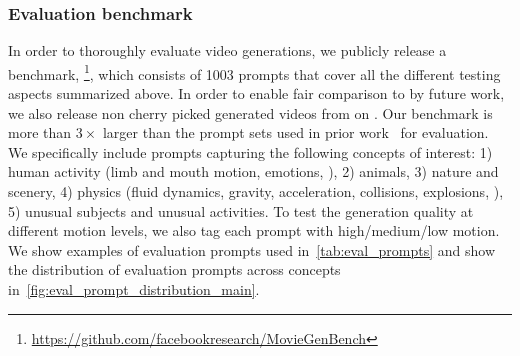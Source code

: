 \subsubsection{Evaluation benchmark}
\label{sec:t2v_eval_benchmark}
In order to thoroughly evaluate video generations, we publicly release a benchmark, \textToVBenchmarkName\footnote{\label{f_note_t2vb_1}\url{https://github.com/facebookresearch/MovieGenBench}}, which consists of 1003 prompts that cover all the different testing aspects summarized above.
In order to enable fair comparison to \OursVideo by future work, we also release non cherry picked generated videos from \OursVideo on \textToVBenchmarkName.
Our benchmark is more than $3\times$ larger than the prompt sets used in prior work~\citep{singer2023makeavideo,emuvideo2023} for evaluation.
We specifically include prompts capturing the following concepts of interest: 1) human activity (limb and mouth motion, emotions, \etc), 2) animals, 3) nature and scenery, 4) physics (fluid dynamics, gravity, acceleration, collisions, explosions, \etc), 5) unusual subjects and unusual activities.
To test the generation quality at different motion levels, we also tag each prompt with high/medium/low motion.
We show examples of evaluation prompts used in~\cref{tab:eval_prompts} and show the distribution of evaluation prompts across concepts in~\cref{fig:eval_prompt_distribution_main}.
\begin{table}[!t]
    \centering
    \caption{\textbf{Sample evaluation prompts from our proposed \textToVBenchmarkName benchmark.} We sample prompts that cover a wide range of concepts, with varying motion levels.}
    \label{tab:eval_prompts}
\end{table}
